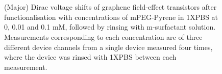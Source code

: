\documentclass[
  a4paper,
]{scrbook}
\begin{document}
\begin{figure}
\begin{minipage}[t]{0.47\linewidth}
{{}

}

\subcaption{\label{fig-pypeg-dirac-shift-plasma}}
\end{minipage}%
\newline
\begin{minipage}[t]{0.26\linewidth}

{\centering 

~

}

\end{minipage}%
%
\begin{minipage}[t]{0.47\linewidth}

{\centering 


}

\subcaption{\label{fig-pypeg-dirac-shift-plasma-surfactant}}
\end{minipage}%
%
\begin{minipage}[t]{0.26\linewidth}

{\centering 

~

}

\end{minipage}%

\caption{\label{fig-mPEGpyrene-Dirac-shift}(Major) Dirac voltage shifts
of graphene field-effect transistors after functionalisation with
concentrations of mPEG-Pyrene in 1XPBS at 0, 0.01 and 0.1 mM, followed
by rinsing with m-surfactant solution. Measurements corresponding to
each concentration are of three different device channels from a single
device measured four times, where the device was rinsed with 1XPBS
between each measurement.}

\end{figure}
\end{document}
